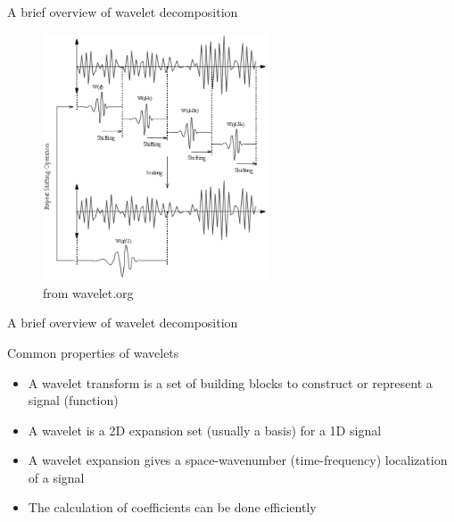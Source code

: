
\begin{frame}{A brief overview of wavelet decomposition}

\begin{figure}
	\includegraphics[width=0.6\textwidth]{wavelet5}
	\caption{from wavelet.org}
\end{figure}
\end{frame}


\begin{frame}{A brief overview of wavelet decomposition}

Common properties of wavelets
\begin{itemize}
	\item A wavelet transform is a set of building blocks to construct or represent a signal  (function)
	\item A wavelet is a 2D expansion set (usually a basis) for a 1D signal
	\item A wavelet expansion gives a space-wavenumber (time-frequency) localization of a signal
	\item The calculation of coefficients can be done efficiently
\end{itemize}
\end{frame}


